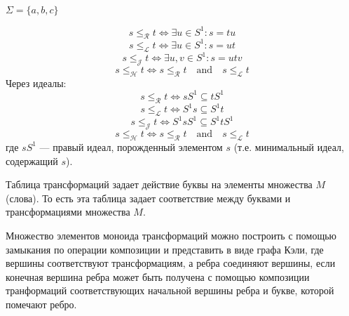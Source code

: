 \documentclass[14pt, russian]{scrartcl}
\begin{document}
\begin{Example}[Алфавит]
  $\Sigma = \{a, b, c\}$
\end{Example}

\begin{Definition}
  \begin{equation}
    s \leq_{\mathcal{R}} t \Leftrightarrow \exists u \in S^{1} : s = tu
  \end{equation}
  \begin{equation}
    s \leq_{\mathcal{L}} t \Leftrightarrow \exists u \in S^{1} : s = ut
  \end{equation}
  \begin{equation}
    s \leq_{\mathcal{J}} t \Leftrightarrow \exists u, v \in S^{1} : s = utv
  \end{equation}
  \begin{equation}
    s \leq_{\mathcal{H}} t \Leftrightarrow s \leq_{\mathcal{R}} t \quad{}\text{and}\quad{} s \leq_{\mathcal{L}} t
  \end{equation}
  Через идеалы:
  \begin{equation}
    s \leq_{\mathcal{R}} t \Leftrightarrow s S^{1} \subseteq t S^{1}
  \end{equation}
  \begin{equation}
    s \leq_{\mathcal{L}} t \Leftrightarrow S^{1}s  \subseteq S^{1} t
  \end{equation}
  \begin{equation}
    s \leq_{\mathcal{J}} t \Leftrightarrow S^{1}s S^{1}  \subseteq S^{1} t S^{1}
  \end{equation}
  \begin{equation}
    s \leq_{\mathcal{H}} t \Leftrightarrow s \leq_{\mathcal{R}} t \quad{}\text{and}\quad{} s \leq_{\mathcal{L}} t
  \end{equation}
  где $sS^{1}$ --- правый идеал, порожденный элементом $s$ (т.е. минимальный
  идеал, содержащий $s$).
\end{Definition}

Таблица трансформаций задает действие буквы на элементы множества $M$ (слова).
То есть эта таблица задает соответствие между буквами и трансформациями
множества $M$.

Множество элементов моноида трансформаций можно построить с помощью замыкания по
операции композиции и представить в виде графа Кэли, где вершины соответствуют
трансформациям, а ребра соединяют вершины, если конечная вершина ребра может
быть получена с помощью композиции транформаций соответствующих начальной
вершины ребра и букве, которой помечают ребро.
\end{document}
